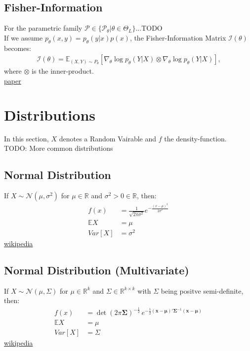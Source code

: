 \subsection{Fisher-Information}
For the parametric family $\mathcal{P} \in \{ \mathcal{P}_\theta | \theta \in \Theta_L\}$...TODO\\
If we assume $p_\theta(x,y)=p_\theta(y|x)p(x)$, the Fisher-Information Matrix $\mathcal{I}(\theta)$ becomes:
\begin{align*}
	\mathcal{I}(\theta) = \mathbb{E}_{(X,Y)\sim {P}_\theta}[\nabla_{\theta}\log p_{\theta}(Y|X)\otimes\nabla_{\theta}\log p_{\theta}(Y|X)]\text{,}
\end{align*}
where $\otimes$ is the inner-product.\\
\href{https://arxiv.org/abs/1711.01530}{paper}

\section{Distributions}
In this section, $X$ denotes a Random Vairable and $f$ the density-function.\\
TODO: More common distributions
\subsection{Normal Distribution}
If $X \sim {\mathcal {N}}(\mu ,\sigma ^{2})$ for ${\displaystyle \mu \in \mathbb {R}}$ and $\sigma ^{2} > 0 \in \mathbb {R}$, then:
\begin{align*}
	f(x) &= {\displaystyle {\frac {1}{\sqrt {2\pi \sigma ^{2}}}}e^{-{\frac {(x-\mu )^{2}}{2\sigma ^{2}}}}}\\
	\mathbb{E}X &= \mu \\
	Var[X] &= \sigma^2
\end{align*}
\href{https://en.wikipedia.org/wiki/Normal_distribution}{wikipedia}

\subsection{Normal Distribution (Multivariate)}
If $X \sim {\mathcal {N}}(\mu ,\Sigma)$ for $\mu \in \mathbb {R}^k$ and $\Sigma \in \mathbb {R}^{k \times k}$ with $\Sigma$ being positve semi-definite, then:
\begin{align*}
	f(x) &= \operatorname {det} (2\pi {\boldsymbol {\Sigma }})^{-{\frac {1}{2}}}\,e^{-{\frac {1}{2}}(\mathbf {x} -{\boldsymbol {\mu }})'{\boldsymbol {\Sigma }}^{-1}(\mathbf {x} -{\boldsymbol {\mu }})}\\
	\mathbb{E}X &= \mu \\
	Var[X] &= \Sigma
\end{align*}
\href{https://en.wikipedia.org/wiki/Multivariate_normal_distribution}{wikipedia}

